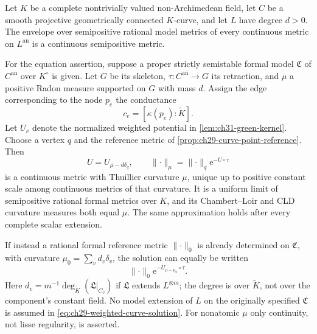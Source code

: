 \begin{theorem}
\label{thm:curves-arbitrary-field-continuity}
Let \(K\) be a complete nontrivially valued non-Archimedean field,
let \(C\) be a smooth projective geometrically connected \(K\)-curve,
and let \(L\) have degree \(d>0\).  The envelope over semipositive
rational model metrics of every continuous metric on \(L^{\mathrm{an}}\)
is a continuous semipositive metric.

For the equation assertion, suppose a proper strictly semistable formal model
\(\mathfrak C\) of \(C^{\mathrm{an}}\) over \(K^\circ\) is given.
Let \(G\) be its skeleton, \(\tau:C^{\mathrm{an}}\to G\) its
retraction, and \(\mu\) a positive Radon measure supported on \(G\)
with mass \(d\).  Assign the edge corresponding to the node \(p_e\)
the conductance
\begin{equation}
\label{eq:ch29-curve-node-conductance}
                  c_e=[\kappa(p_e):\widetilde K].
\end{equation}
Let \(U_\nu\) denote the normalized weighted potential in
\cref{lem:ch31-green-kernel}.  Choose a vertex \(q\) and the reference metric of
\cref{prop:ch29-curve-point-reference}.  Then
\begin{equation}
\label{eq:ch29-weighted-curve-solution}
 U=U_{\mu-d\delta_q},
 \qquad
 \lVert\cdot\rVert_\mu
       =\lVert\cdot\rVert_q\mathrm e^{-U\circ\tau}
\end{equation}
is a continuous metric with Thuillier curvature \(\mu\), unique up to
positive constant scale among continuous metrics of that curvature.
It is a uniform limit of semipositive rational formal metrics over
\(K\), and its Chambert--Loir and CLD curvature measures both equal
\(\mu\).  The same approximation holds after every complete scalar
extension.

If instead a rational formal reference metric \(\lVert\cdot\rVert_0\)
is already determined on \(\mathfrak C\), with curvature
\(\mu_0=\sum_v d_v\delta_v\), the solution can equally be written
\begin{equation}
\label{eq:ch29-curve-model-reference-solution}
 \lVert\cdot\rVert_0\mathrm e^{-U_{\mu-\mu_0}\circ\tau}.
\end{equation}
Here \(d_v=m^{-1}\deg_{\widetilde K}(\mathfrak L|_{C_v})\) if
\(\mathfrak L\) extends \(L^{\otimes m}\); the degree is over
\(\widetilde K\), not over the component's constant field.
No model extension of \(L\) on the originally specified
\(\mathfrak C\) is assumed in \eqref{eq:ch29-weighted-curve-solution}.
For nonatomic \(\mu\) only continuity, not lisse regularity, is asserted.
\end{theorem}

